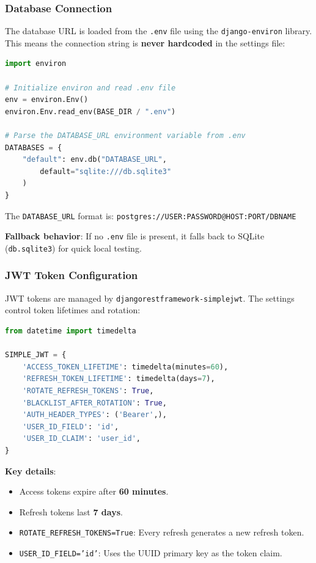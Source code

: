 \documentclass[12pt, a4paper]{article}
\begin{document}
\subsubsection{Database Connection}

The database URL is loaded from the \texttt{.env} file using the \texttt{django-environ} library. This means the connection string is \textbf{never hardcoded} in the settings file:

\begin{lstlisting}[language=Python, caption={Database Configuration in base.py}]
import environ

# Initialize environ and read .env file
env = environ.Env()
environ.Env.read_env(BASE_DIR / ".env")

# Parse the DATABASE_URL environment variable from .env
DATABASES = {
    "default": env.db("DATABASE_URL",
        default="sqlite:///db.sqlite3"
    )
}
\end{lstlisting}

The \texttt{DATABASE\_URL} format is: \texttt{postgres://USER:PASSWORD@HOST:PORT/DBNAME}

\textbf{Fallback behavior}: If no \texttt{.env} file is present, it falls back to SQLite (\texttt{db.sqlite3}) for quick local testing.

\subsubsection{JWT Token Configuration}

JWT tokens are managed by \texttt{djangorestframework-simplejwt}. The settings control token lifetimes and rotation:

\begin{lstlisting}[language=Python, caption={JWT Configuration in base.py}]
from datetime import timedelta

SIMPLE_JWT = {
    'ACCESS_TOKEN_LIFETIME': timedelta(minutes=60),
    'REFRESH_TOKEN_LIFETIME': timedelta(days=7),
    'ROTATE_REFRESH_TOKENS': True,
    'BLACKLIST_AFTER_ROTATION': True,
    'AUTH_HEADER_TYPES': ('Bearer',),
    'USER_ID_FIELD': 'id',
    'USER_ID_CLAIM': 'user_id',
}
\end{lstlisting}

\textbf{Key details}:
\begin{itemize}
    \item Access tokens expire after \textbf{60 minutes}.
    \item Refresh tokens last \textbf{7 days}.
    \item \texttt{ROTATE\_REFRESH\_TOKENS=True}: Every refresh generates a new refresh token.
    \item \texttt{USER\_ID\_FIELD='id'}: Uses the UUID primary key as the token claim.
\end{itemize}
\end{document}
